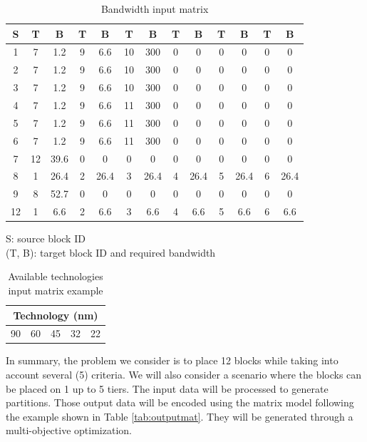 \begin{table}[h!]
\caption{Bandwidth input matrix}
\begin{center}
\begin{scriptsize}
\begin{tabular}{|c|c|c|c|c|c|c|c|c|c|c|c|c|}
\hline S & T & B & T & B & T & B & T & B & T & B & T & B \\
\hline 1 & 7 & 1.2 & 9 & 6.6 & 10 & 300 & 0 & 0 & 0 & 0 & 0 & 0\\
2 & 7 & 1.2 & 9 & 6.6 & 10 & 300 & 0 & 0 & 0 & 0 & 0 & 0\\
3 & 7 & 1.2 & 9 & 6.6 & 10 & 300 & 0 & 0 & 0 & 0 & 0 & 0\\
4 & 7 & 1.2 & 9 & 6.6 & 11 & 300 & 0 & 0 & 0 & 0 & 0 & 0\\
5 & 7 & 1.2 & 9 & 6.6 & 11 & 300 & 0 & 0 & 0 & 0 & 0 & 0\\
6 & 7 & 1.2 & 9 & 6.6 & 11 & 300 & 0 & 0 & 0 & 0 & 0 & 0\\
7 & 12 & 39.6 & 0 & 0 & 0 & 0 & 0 & 0 & 0 & 0 & 0 & 0\\
8 & 1 & 26.4 & 2 & 26.4 & 3 & 26.4 & 4 & 26.4 & 5 & 26.4 & 6 & 26.4\\
9 & 8 & 52.7 & 0 & 0 & 0 & 0 & 0 & 0 & 0 & 0 & 0 & 0\\
12 & 1 & 6.6 & 2 & 6.6 & 3 & 6.6 & 4 & 6.6 & 5 & 6.6 & 6 & 6.6\\
\hline
\end{tabular}
\end{scriptsize}
\end{center}
\begin{center}
S: source block ID\\
(T, B): target block ID and required bandwidth
\end{center}
\label{tab:bwmatrix}
\end{table}

\begin{table}[h!]
\caption{Available technologies input matrix example}
\begin{center}
\begin{tabular}{|c|c|c|c|c|}
\hline \multicolumn{5}{|c|}{Technology (nm)}\\
\hline 90 & 60 & 45 & 32 & 22\\
\hline
\end{tabular}
\end{center}
\label{tab:tech}
\end{table}

In summary, the problem we consider is to place 12 blocks while taking into account several (5) criteria. We will also consider a scenario where the blocks can be placed on 1 up to 5 tiers. The input data will be processed to generate partitions. Those output data will be encoded using the matrix model following the example shown in Table \ref{tab:outputmat}. They will be generated through a multi-objective optimization.

